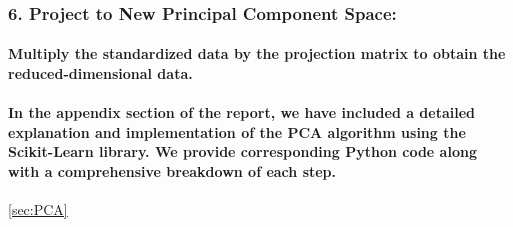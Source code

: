 \subsubsection*{6. Project to New Principal Component Space:}
\paragraph{Multiply the standardized data by the projection matrix to obtain the reduced-dimensional data.}
% 
% 
% 
\paragraph{In the appendix section of the report, we have included a detailed explanation and implementation of the PCA algorithm using the Scikit-Learn library. We provide corresponding Python code along with a comprehensive breakdown of each step.}\ref{sec:PCA}